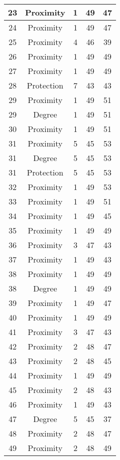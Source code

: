 \documentclass[results.tex]{subfiles}
\begin{document}
\begin{center}
\begin{tabular}{| c || c | c | c | c |}
    \hline
    23 & Proximity & 1 & 49 & 47 \\ 
    \hline
    24 & Proximity & 1 & 49 & 47 \\ 
    \hline
    25 & Proximity & 4 & 46 & 39 \\ 
    \hline
    26 & Proximity & 1 & 49 & 49 \\ 
    \hline
    27 & Proximity & 1 & 49 & 49 \\ 
    \hline
    28 & Protection & 7 & 43 & 43 \\ 
    \hline
    29 & Proximity & 1 & 49 & 51 \\ 
    \hline
    29 & Degree & 1 & 49 & 51 \\ 
    \hline
    30 & Proximity & 1 & 49 & 51 \\ 
    \hline
    31 & Proximity & 5 & 45 & 53 \\ 
    \hline
    31 & Degree & 5 & 45 & 53 \\ 
    \hline
    31 & Protection & 5 & 45 & 53 \\ 
    \hline
    32 & Proximity & 1 & 49 & 53 \\ 
    \hline
    33 & Proximity & 1 & 49 & 51 \\ 
    \hline
    34 & Proximity & 1 & 49 & 45 \\ 
    \hline
    35 & Proximity & 1 & 49 & 49 \\ 
    \hline
    36 & Proximity & 3 & 47 & 43 \\ 
    \hline
    37 & Proximity & 1 & 49 & 43 \\ 
    \hline
    38 & Proximity & 1 & 49 & 49 \\ 
    \hline
    38 & Degree & 1 & 49 & 49 \\ 
    \hline
    39 & Proximity & 1 & 49 & 47 \\ 
    \hline
    40 & Proximity & 1 & 49 & 49 \\ 
    \hline
    41 & Proximity & 3 & 47 & 43 \\ 
    \hline
    42 & Proximity & 2 & 48 & 47 \\ 
    \hline
    43 & Proximity & 2 & 48 & 45 \\ 
    \hline
    44 & Proximity & 1 & 49 & 49 \\ 
    \hline
    45 & Proximity & 2 & 48 & 43 \\ 
    \hline
    46 & Proximity & 1 & 49 & 43 \\ 
    \hline
    47 & Degree & 5 & 45 & 37 \\ 
    \hline
    48 & Proximity & 2 & 48 & 47 \\ 
    \hline
    49 & Proximity & 2 & 48 & 49 \\ 
    \hline   \end{tabular}
\end{center}
\end{document}
